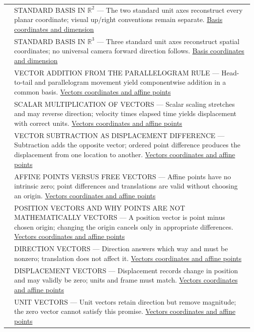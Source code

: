 {\begin{longtable}[]{@{}
  >{\raggedright\arraybackslash}p{}
  >{\raggedright\arraybackslash}p{}@{}}
516 & STANDARD BASIS IN \(\mathbb R^2\) --- The two standard unit axes reconstruct every planar coordinate; visual up/right conventions remain separate. \hyperref[appendix-ce0341f7ea0d]{Basis coordinates and dimension} \\
517 & STANDARD BASIS IN \(\mathbb R^3\) --- Three standard unit axes reconstruct spatial coordinates; no universal camera forward direction follows. \hyperref[appendix-ce0341f7ea0d]{Basis coordinates and dimension} \\
518 & VECTOR ADDITION FROM THE PARALLELOGRAM RULE --- Head-to-tail and parallelogram movement yield componentwise addition in a common basis. \hyperref[appendix-0659864c0aa3]{Vectors coordinates and affine points} \\
519 & SCALAR MULTIPLICATION OF VECTORS --- Scalar scaling stretches and may reverse direction; velocity times elapsed time yields displacement with correct units. \hyperref[appendix-0659864c0aa3]{Vectors coordinates and affine points} \\
520 & VECTOR SUBTRACTION AS DISPLACEMENT DIFFERENCE --- Subtraction adds the opposite vector; ordered point difference produces the displacement from one location to another. \hyperref[appendix-0659864c0aa3]{Vectors coordinates and affine points} \\
521 & AFFINE POINTS VERSUS FREE VECTORS --- Affine points have no intrinsic zero; point differences and translations are valid without choosing an origin. \hyperref[appendix-0659864c0aa3]{Vectors coordinates and affine points} \\
522 & POSITION VECTORS AND WHY POINTS ARE NOT MATHEMATICALLY VECTORS --- A position vector is point minus chosen origin; changing the origin cancels only in appropriate differences. \hyperref[appendix-0659864c0aa3]{Vectors coordinates and affine points} \\
523 & DIRECTION VECTORS --- Direction answers which way and must be nonzero; translation does not affect it. \hyperref[appendix-0659864c0aa3]{Vectors coordinates and affine points} \\
524 & DISPLACEMENT VECTORS --- Displacement records change in position and may validly be zero; units and frame must match. \hyperref[appendix-0659864c0aa3]{Vectors coordinates and affine points} \\
525 & UNIT VECTORS --- Unit vectors retain direction but remove magnitude; the zero vector cannot satisfy this promise. \hyperref[appendix-0659864c0aa3]{Vectors coordinates and affine points} \\

\end{longtable}}
